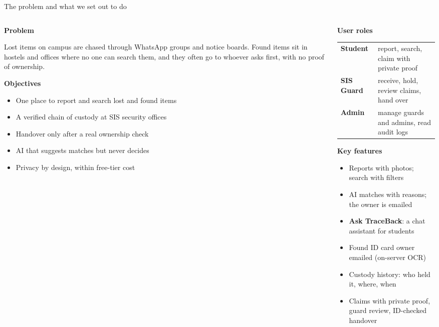 \documentclass[aspectratio=169,10pt]{beamer}
\newcommand{\pill}[2][brand]{{\setlength{\fboxsep}{1.6pt}\colorbox{#1!12}{\scriptsize\color{#1}\textbf{#2}}}}
\newcommand{\head}[1]{{\footnotesize\bfseries\color{branddark}#1}\par\vspace{1pt}}
\begin{document}
\begin{frame}[t]{The problem and what we set out to do}
\begin{columns}[T,onlytextwidth]
\begin{column}{0.46\textwidth}
\head{Problem}
\scriptsize
Lost items on campus are chased through WhatsApp groups and notice boards. Found items sit in hostels and offices where no one can search them, and they often go to whoever asks first, with no proof of ownership.
\vspace{6pt}

\head{Objectives}
\begin{itemize}\setlength{\itemsep}{0pt}\scriptsize
\item One place to report and search lost and found items
\item A verified chain of custody at SIS security offices
\item Handover only after a real ownership check
\item AI that suggests matches but never decides
\item Privacy by design, within free-tier cost
\end{itemize}
\end{column}
\begin{column}{0.50\textwidth}
\head{User roles}
\scriptsize
\renewcommand{\arraystretch}{1.15}
\begin{tabular}{@{}l L{3.9cm}@{}}
\pill{Student} & report, search, claim with private proof \\
\pill[found]{SIS Guard} & receive, hold, review claims, hand over \\
\pill[amber]{Admin} & manage guards and admins, read audit logs \\
\end{tabular}
\vspace{5pt}

\head{Key features}
\begin{itemize}\setlength{\itemsep}{0pt}\scriptsize
\item Reports with photos; search with filters
\item AI matches with reasons; the owner is emailed
\item \textbf{Ask TraceBack}: a chat assistant for students
\item Found ID card \textrightarrow{} owner emailed (on-server OCR)
\item Custody history: who held it, where, when
\item Claims with private proof, guard review, ID-checked handover
\end{itemize}
\end{column}
\end{columns}
\end{frame}
\end{document}
